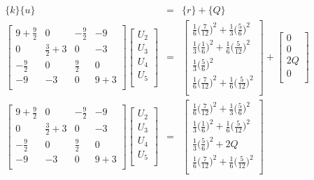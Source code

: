 \documentclass[a4paper]{article}
\begin{document}
\begin{eqnarray*}
\{k \} \{ u \} & = & \{ r \} + \{ Q \}\\
\begin{bmatrix}
9 + \frac{9}{2} & 0 & -\frac{9}{2} & -9\\
0 & \frac{3}{2} + 3 & 0 & -3\\
-\frac{9}{2} & 0 & \frac{9}{2} & 0\\
-9 & -3 & 0 & 9 +3\\
\end{bmatrix}
\begin{bmatrix}
U_{2}\\
U_{3}\\
U_{4}\\
U_{5}\\
\end{bmatrix}
& = & 
\begin{bmatrix}
\frac{1}{6} \big(\frac{7}{12} \big)^{2}+\frac{1}{3} \big(\frac{5}{6}\big)^{2}\\[3pt]
\frac{1}{3} \big(\frac{1}{6} \big)^{2}+\frac{1}{6} \big(\frac{5}{12}\big)^{2}\\[3pt]
\frac{1}{3} \big( \frac{5}{6}\big)^{2}\\[3pt]
\frac{1}{6} \big(\frac{7}{12} \big)^{2}+\frac{1}{6} \big(\frac{5}{12}\big)^{2}\\
\end{bmatrix} +
\begin{bmatrix}
0\\
0\\
2Q\\
0\\
\end{bmatrix}\\
\begin{bmatrix}
9 + \frac{9}{2} & 0 & -\frac{9}{2} & -9\\
0 & \frac{3}{2} + 3 & 0 & -3\\
-\frac{9}{2} & 0 & \frac{9}{2} & 0\\
-9 & -3 & 0 & 9 +3\\
\end{bmatrix}
\begin{bmatrix}
U_{2}\\
U_{3}\\
U_{4}\\
U_{5}\\
\end{bmatrix}
& = & 
\begin{bmatrix}
\frac{1}{6} \big(\frac{7}{12} \big)^{2}+\frac{1}{3} \big(\frac{5}{6}\big)^{2}\\[3pt]
\frac{1}{3} \big(\frac{1}{6} \big)^{2}+\frac{1}{6} \big(\frac{5}{12}\big)^{2}\\[3pt]
\frac{1}{3} \big( \frac{5}{6}\big)^{2} + 2Q\\[3pt]
\frac{1}{6} \big(\frac{7}{12} \big)^{2}+\frac{1}{6} \big(\frac{5}{12}\big)^{2}\\
\end{bmatrix}
\end{eqnarray*}
\end{document}
